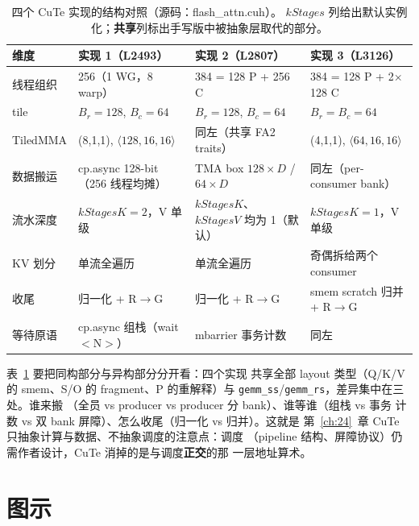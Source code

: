 \begin{table}[htbp]
\centering
\caption{四个 CuTe 实现的结构对照（源码：flash\_attn.cuh）。
$kStages$ 列给出默认实例化；\textbf{共享}列标出手写版中被抽象层取代的部分。}
\label{tab:25-struct}
\begin{tabular}{p{2.6cm}p{3.3cm}p{3.3cm}p{3.3cm}}
\toprule
维度 & 实现 1（L2493） & 实现 2（L2807） & 实现 3（L3126） \\
\midrule
线程组织 & 256（1 WG，8 warp） & 384 = 128 P + 256 C & 384 = 128 P + 2$\times$128 C \\
tile & $B_r{=}128$, $B_c{=}64$ & $B_r{=}128$, $B_c{=}64$ & $B_r{=}B_c{=}64$ \\
TiledMMA & (8,1,1), $\langle128,16,16\rangle$ & 同左（共享 FA2 traits） & (4,1,1), $\langle64,16,16\rangle$ \\
数据搬运 & cp.async 128-bit（256 线程均摊） & TMA box $128\!\times\!D$ / $64\!\times\!D$ & 同左（per-consumer bank） \\
流水深度 & $kStagesK{=}2$，V 单级 & $kStagesK$、$kStagesV$ 均为 1（默认） & $kStagesK{=}1$，V 单级 \\
KV 划分 & 单流全遍历 & 单流全遍历 & 奇偶拆给两个 consumer \\
收尾 & 归一化 + R$\to$G & 归一化 + R$\to$G & smem scratch 归并 + R$\to$G \\
等待原语 & cp.async 组栈（wait$<$N$>$） & mbarrier 事务计数 & 同左 \\
\bottomrule
\end{tabular}
\end{table}

表~\ref{tab:25-struct} 要把同构部分与异构部分分开看：四个实现
共享全部 layout 类型（Q/K/V 的 smem、S/O 的 fragment、P 的重解释）与
\texttt{gemm\_ss}/\texttt{gemm\_rs}，差异集中在三处。谁来搬
（全员 vs producer vs producer 分 bank）、谁等谁（组栈 vs 事务
计数 vs 双 bank 屏障）、怎么收尾（归一化 vs 归并）。这就是
第~\ref{ch:24}~章 CuTe 只抽象计算与数据、不抽象调度的注意点：调度
（pipeline 结构、屏障协议）仍需作者设计，CuTe 消掉的是与调度\textbf{正交}的那
一层地址算术。

\section{图示}

